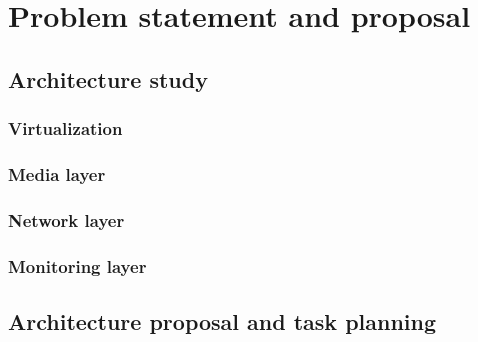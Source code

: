 \chapter{Problem statement and proposal}\label{B:platformStudyAndProposal}

\section{Architecture study}
\subsection{Virtualization}
\subsection{Media layer}
\subsection{Network layer}
\subsection{Monitoring layer}
\section{Architecture proposal and task planning}



